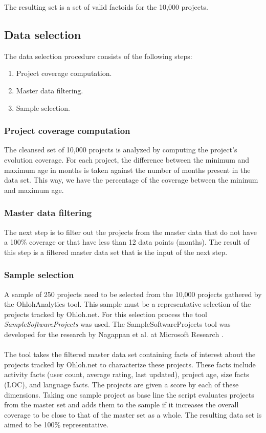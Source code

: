 \noindent
The resulting set is a set of valid factoids for the 10,000 projects.

\subsection{Data selection}
The data selection procedure consists of the following steps:
\begin{enumerate}
	\item Project coverage computation.
	\item Master data filtering.
	\item Sample selection.
\end{enumerate}

\subsubsection{Project coverage computation}
The cleansed set of 10,000 projects is analyzed by computing the project's
evolution coverage. For each project, the difference between the minimum and
maximum age in months is taken against the number of months present in the
data set. This way, we have the percentage of the coverage between the mininum
and maximum age.

\subsubsection{Master data filtering}
The next step is to filter out the projects from the master data that do not
have a 100\% coverage or that have less than 12 data points (months). The result
of this step is a filtered master data set that is the input of the next step.

\subsubsection{Sample selection}
A sample of 250 projects need to be selected from the 10,000 projects gathered
by the OhlohAnalytics tool. This sample must be a representative selection of
the projects tracked by Ohloh.net. For this selection process the tool
\emph{SampleSoftwareProjects }\rm was used. The SampleSoftwareProjects tool was
developed for the research by Nagappan et al. at Microsoft Research
\cite{nagappan}.

\paragraph{}
The tool takes the filtered master data set containing facts of interest about
the projects tracked by Ohloh.net to characterize these projects. These facts
include activity facts (user count, average rating, last updated), project age,
size facts (LOC), and language facts. The projects are given a score by each of
these dimensions. Taking one sample project as base line the script evaluates
projects from the master set and adds them to the sample if it increases the
overall coverage to be close to that of the master set as a whole. The
resulting data set is aimed to be 100\% representative.

